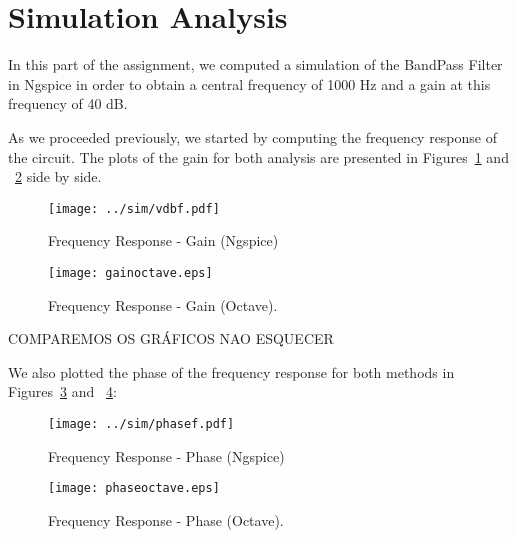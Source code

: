\section{Simulation Analysis}
\label{sec:simulation}

In this part of the assignment, we computed a simulation of the BandPass Filter in Ngspice in order to obtain a central frequency of 1000 Hz and a gain at this frequency of 40 dB.

As we proceeded previously, we started by computing the frequency response of the circuit. The plots of the gain for both analysis are presented in Figures~\ref{fig:gainngspice} and ~\ref{fig:gainoctave} side by side.

\vspace{-25mm}

\noindent
\begin{minipage}[c]{0.5\linewidth}

\begin{figure}[H] \centering
\texttt{[image: ../sim/vdbf.pdf]}
\caption{Frequency Response - Gain (Ngspice)}
\label{fig:gainngspice}
\end{figure}

\end{minipage}
\begin{minipage}[c]{0.5\linewidth}

\vspace{16mm}

\begin{figure}[H] \centering
\texttt{[image: gainoctave.eps]}
\caption{Frequency Response - Gain (Octave).}
\label{fig:gainoctave}
\end{figure}

\end{minipage}

COMPAREMOS OS GRÁFICOS NAO ESQUECER

\vspace{10mm}

We also plotted the phase of the frequency response for both methods in Figures~\ref{fig:phasengspice} and ~\ref{fig:phaseoctave}:

\vspace{-25mm}

\noindent
\begin{minipage}[c]{0.5\linewidth}

\begin{figure}[H] \centering
\texttt{[image: ../sim/phasef.pdf]}
\caption{Frequency Response - Phase (Ngspice)}
\label{fig:phasengspice}
\end{figure}

\end{minipage}
\begin{minipage}[c]{0.5\linewidth}

\vspace{16mm}

\begin{figure}[H] \centering
\texttt{[image: phaseoctave.eps]}
\caption{Frequency Response - Phase (Octave).}
\label{fig:phaseoctave}
\end{figure}

\end{minipage}

